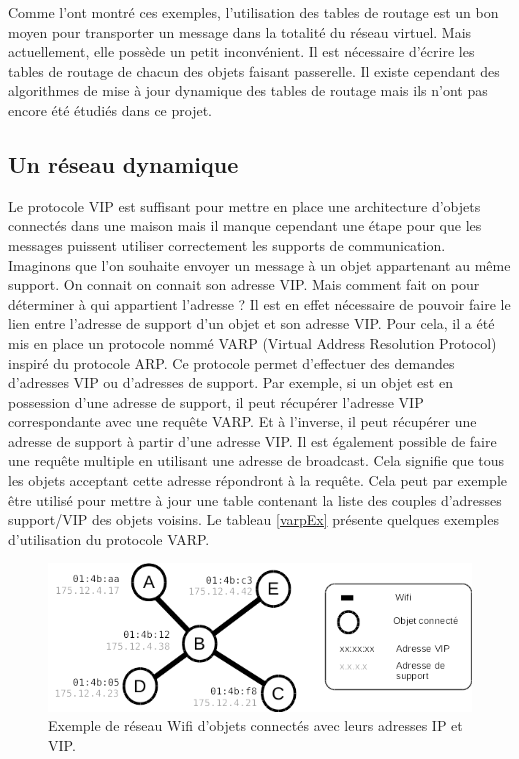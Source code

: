 			Comme l'ont montré ces exemples, l'utilisation des tables de routage est un bon moyen 
pour
			transporter un message dans la totalité du réseau virtuel. Mais actuellement, elle possède
			un petit inconvénient. Il est nécessaire d'écrire les tables de routage de chacun des
			objets faisant passerelle. Il existe cependant des algorithmes de mise à jour dynamique
			des tables de routage mais ils n'ont pas encore été étudiés dans ce projet.

	\subsection{Un réseau dynamique}
		Le protocole VIP est suffisant pour mettre en place une architecture d'objets connectés dans
		une maison mais il manque cependant une étape pour que les messages puissent utiliser
		correctement les supports de communication. Imaginons que l'on souhaite envoyer un message 
		à un objet appartenant au même support. On connait on connait son adresse VIP. Mais comment 
		fait on pour déterminer à qui appartient l'adresse ? Il est en effet nécessaire de pouvoir 
		faire le lien entre l'adresse de support d'un objet et son adresse VIP. Pour cela, il a été
		mis en place un protocole nommé VARP (Virtual Address Resolution Protocol) inspiré du
		protocole ARP. Ce protocole permet d'effectuer des demandes d'adresses VIP ou d'adresses de
		support. Par exemple, si un objet est en possession d'une adresse de support, il peut
		récupérer l'adresse VIP correspondante avec une requête VARP. Et à l'inverse, il peut
		récupérer une adresse de support à partir d'une adresse VIP. Il est également possible de
		faire une requête multiple en utilisant une adresse de broadcast. Cela signifie que tous les
		objets acceptant cette adresse répondront à la requête. Cela peut par exemple être utilisé
		pour mettre à jour une table contenant la liste des couples d'adresses support/VIP des objets
		voisins. Le tableau \ref{varpEx} présente quelques exemples d'utilisation du protocole VARP.
		
		\begin{figure}[!ht]
			\centering
			\includegraphics[width=\textwidth]{img/varp_net.png}
			\caption{Exemple de réseau Wifi d'objets connectés avec leurs adresses IP et VIP.}
			\label{varpNet}
		\end{figure}
		
